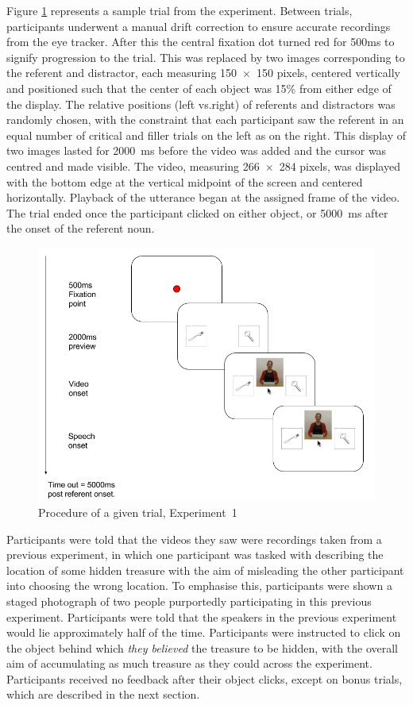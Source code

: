 \documentclass[a4paper,man,natbib]{apa6}
\begin{document}
Figure \ref{fig:v1_trial} represents a sample trial from the experiment. 
Between trials, participants underwent a manual drift correction to ensure accurate recordings from the eye tracker.
After this the central fixation dot turned red for 500ms to signify progression to the trial. 
This was replaced by two images corresponding to the referent and distractor, each measuring 150~$\times$~150 pixels, centered vertically and positioned such that the center of each object was 15\% from either edge of the display. 
The relative positions (left vs.\@ right) of referents and distractors was randomly chosen, with the constraint that each participant saw the referent in an equal number of critical and filler trials on the left as on the right.
This display of two images lasted for 2000~ms before the video was added and the cursor was centred and made visible.
The video, measuring 266~$\times$~284 pixels, was displayed with the bottom edge at the vertical midpoint of the screen and centered horizontally.
Playback of the utterance began at the assigned frame of the video.
The trial ended once the participant clicked on either object, or 5000~ms after the onset of the referent noun.

\begin{figure}[Ht]
  \centering
	\includegraphics[width=\linewidth]{./img/e7_trial.png}
  \caption{Procedure of a given trial, Experiment~1}
  \label{fig:v1_trial}
\end{figure}

Participants were told that the videos they saw were recordings taken from a previous experiment, in which one participant was tasked with describing the location of some hidden treasure with the aim of misleading the other participant into choosing the wrong location.
To emphasise this, participants were shown a staged photograph of two people purportedly participating in this previous experiment. 
Participants were told that the speakers in the previous experiment would lie approximately half of the time. 
Participants were instructed to click on the object behind which \textit{they believed} the treasure to be hidden, with the overall aim of accumulating as much treasure as they could across the experiment.
Participants received no feedback after their object clicks, except on bonus trials, which are described in the next section.
\end{document}
